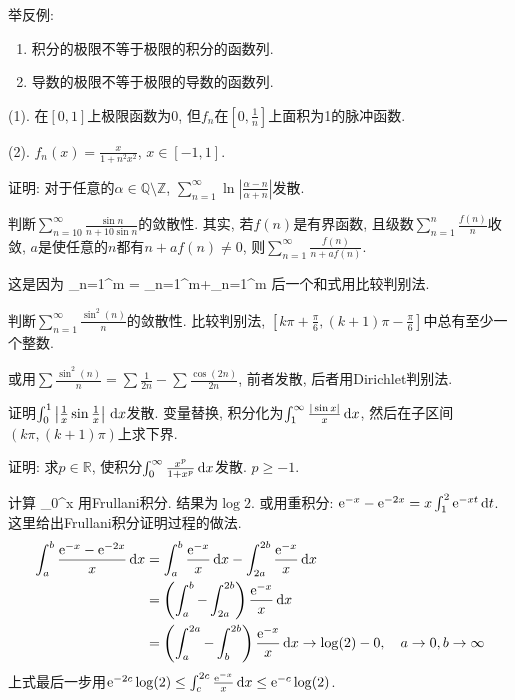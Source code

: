 \bq{}{}
举反例:
\begin{enumerate}[(1)]
 \item 积分的极限不等于极限的积分的函数列.
 \item 导数的极限不等于极限的导数的函数列.
\end{enumerate}
\eq
\ba
(1). 在$[0,1]$上极限函数为0, 但$f_n$在$\left[0,\frac1n\right]$上面积为1的脉冲函数.

(2). $f_n(x)=\frac{x}{1+n^2x^2}$, $x\in[-1,1]$.
\ea

证明: 对于任意的$\alpha\in\mathbb{Q}\setminus\mathbb{Z}$, $\sum_{n=1}^{\infty}\ln\left|\frac{\alpha-n}{\alpha+n}\right|$发散.
\eq

判断$\sum_{n=10}^{\infty}\frac{\sin n}{n+10\sin n}$的敛散性.
\eq
\ba
其实, 若$f(n)$是有界函数, 且级数$\sum_{n=1}^{n}\frac{f(n)}{n}$收敛, $a$是使任意的$n$都有$n+af(n)\ne 0$, 则$\sum_{n=1}^{\infty}\frac{f(n)}{n+af(n)}$.

这是因为
\bee
\sum_{n=1}^{m}
  = \sum_{n=1}^{m}+\sum_{n=1}^{m}
\eee
后一个和式用比较判别法.
\ea

判断$\sum_{n=1}^{\infty}\frac{\sin^2(n)}{n}$的敛散性.
\eq
\ba
比较判别法, $[k\pi+\frac{\pi}{6}, (k+1)\pi-\frac{\pi}{6}]$中总有至少一个整数.

或用$\sum\frac{\sin^2(n)}{n}=\sum\frac{1}{2n}-\sum\frac{\cos(2n)}{2n}$, 前者发散, 后者用Dirichlet判别法.
\ea

证明$\int_0^1\left|\frac{1}{x}\sin\frac{1}{x}\right|\,\mathrm{d} x$发散.
\eq
\ba
变量替换, 积分化为$\int_1^{\infty}\frac{|\sin x|}{x}\,\mathrm{d} x$, 然后在子区间$(k\pi, (k+1)\pi)$上求下界. 
\ea

证明: 求$p\in\mathbb{R}$, 使积分$\int_0^{\infty}\frac{x^p}{1+x^p}\,\mathrm{d} x$发散.
\eq
\ba
$p\ge-1$.
\ea

计算
\bee
\int_0^{\infty}\ud x
\eee
\eq
\ba
用Frullani积分. 结果为$\log 2$. 或用重积分: $\mathrm{e}^{-x}-\mathrm{e}^{-2x}=x\int_1^2\mathrm{e}^{-xt}\,\mathrm{d} t$. 这里给出Frullani积分证明过程的做法.
\begin{align*}
 \int_a^b\frac{\mathrm{e}^{-x}-\mathrm{e}^{-2x}}{x}\,\mathrm{d} x
  & =\int_a^b\frac{\mathrm{e}^{-x}}{x}\,\mathrm{d} x - \int_{2a}^{2b}\frac{\mathrm{e}^{-x}}{x}\,\mathrm{d} x\\
  & =\left(\int_a^b-\int_{2a}^{2b}\right)\frac{\mathrm{e}^{-x}}{x}\,\mathrm{d} x\\
  & = \left(\int_a^{2a}-\int_{b}^{2b}\right)\frac{\mathrm{e}^{-x}}{x}\,\mathrm{d} x\to\log(2)-0, \quad a\to0, b\to\infty
\end{align*}
上式最后一步用$\mathrm{e}^{-2c}\log(2)\le\int_c^{2c}\frac{\mathrm{e}^{-x}}{x}\,\mathrm{d} x\le\mathrm{e}^{-c}\log(2)$.
\ea

